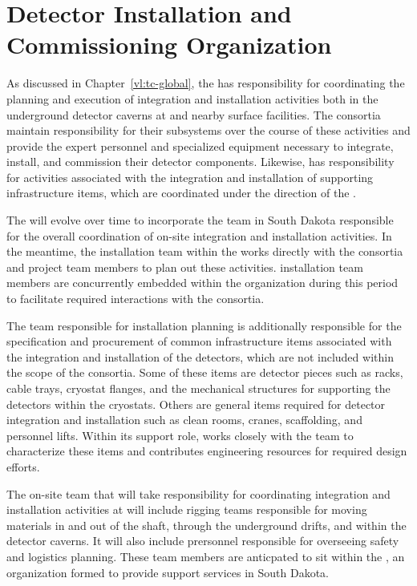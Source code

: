 \chapter{Detector Installation and Commissioning Organization}
\label{ch:tc-jpo}

As discussed in Chapter~\ref{vl:tc-global}, the  has
responsibility for coordinating the planning and execution of 
 integration and installation activities both 
in the underground detector caverns at  and 
nearby surface facilities.  The  consortia maintain 
responsibility for their subsystems over the course of these 
activities and provide the expert personnel and specialized 
equipment necessary to integrate, install, and commission their 
detector components.  Likewise,  has responsibility 
for activities associated with the integration and installation 
of supporting infrastructure items, which are coordinated under 
the direction of the .       

The  will evolve over time to incorporate the team in South 
Dakota responsible for the overall coordination of on-site integration 
and installation activities.  In the meantime, the installation team 
within the  works directly with the  consortia 
and  project team members to plan out these activities.  
 installation team members are concurrently embedded 
within the   organization during this period to 
facilitate required interactions with the  consortia. 

The  team responsible for installation planning is additionally 
responsible for the specification and procurement of common infrastructure 
items associated with the integration and installation of the detectors, 
which are not included within the scope of the  consortia.  
Some of these items are detector pieces such as racks, cable trays, cryostat 
flanges, and the mechanical structures for supporting the detectors within 
the cryostats.  Others are general items required for detector integration 
and installation such as clean rooms, cranes, scaffolding, and personnel 
lifts.  Within its support role,   works closely with 
the  team to characterize these items and contributes engineering 
resources for required design efforts.

The on-site  team that will take responsibility for coordinating
integration and installation activities at  will include rigging 
teams responsible for moving materials in and out of the shaft, through the 
underground drifts, and within the detector caverns.  It will also include 
prersonnel responsible for overseeing safety and logistics planning.  These 
team members are anticpated to sit within the , an organization 
formed to provide  support services in South Dakota.    

